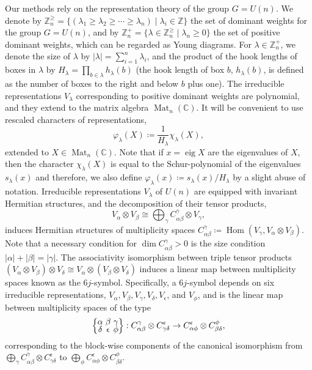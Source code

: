 \documentclass[notitlepage, 11pt, letterpaper]{amsart}
\theoremstyle{plain}
\theoremstyle{definition}
\DeclareMathOperator{\Mat}{Mat}
\DeclareMathOperator{\Hom}{Hom}
\DeclareMathOperator{\eig}{eig}
\newcommand{\undomweights}[1]{\mathbb Z^{\geq}_{#1}}
\newcommand{\undomweightsp}[1]{\mathbb Z^{+}_{#1}}
\newcommand{\ot}{\otimes} %
\newcommand{\vp}{\varphi} %
\newcommand{\ex}{x}
\newcommand{\ya}{\alpha}
\newcommand{\yb}{\beta}
\newcommand{\yc}{\gamma}
\newcommand{\yd}{\delta}
\newcommand{\ye}{\epsilon}
\newcommand{\yf}{\phi}
\newcommand{\yx}{\lambda}
\newcommand{\sya}{|\ya|}
\newcommand{\syb}{|\yb|}
\newcommand{\syc}{|\yc|}
\newcommand{\syx}{|\yx|}
\newcommand{\tightcurlysixj}[1]{
\begingroup
\arraycolsep=1.5pt
\renewcommand{\arraystretch}{0.3}
\left\{\!\begin{array}{ccc}
    #1
\end{array}\!\right\}
\endgroup
}
\newcommand{\abcdefsymbol}{\tightcurlysixj{\alpha & \beta & \gamma \\ \delta & \epsilon & \phi}}
\begin{document}
Our methods rely on the representation theory of the group $G = U(n)$.
We denote by $\undomweights{n} = \{ (\yx_1 \geq \yx_2 \geq \cdots \geq \yx_n) \mid \yx_i \in \mathbb{Z} \}$ the set of dominant weights for the group $G=U(n)$, and
by $\undomweightsp{n} = \{ \yx \in \undomweights{n} \mid \yx_n \geq 0\}$ the set of positive dominant weights, which can be regarded as Young diagrams.
For $\yx \in \undomweightsp{n}$, we denote the size of $\yx$ by $\syx = \sum_{i=1}^n \yx_i$, and the product of the hook lengths of boxes in $\yx$ by $H_{\yx} = \prod_{b\in \yx} h_{\yx}(b)$ (the hook length of box $b$, $h_{\yx}(b)$, is defined as the number of boxes to the right and below $b$ plus one).
The irreducible representations $V_{\yx}$ corresponding to positive dominant weights are polynomial, and they extend to the matrix algebra $\Mat_n(\mathbb{C})$.
It will be convenient to use rescaled characters of representations,
\begin{equation}
    \vp_\yx(X) \coloneq \frac{1}{H_\yx} \chi_\yx(X),
\end{equation}
extended to $X \in \Mat_n(\mathbb{C})$.
Note that if $\ex = \eig X$ are the eigenvalues of $X$, then the character $\chi_\yx(X)$ is equal to the Schur-polynomial of the eigenvalues $s_{\yx}(\ex)$ and therefore, we also define $\vp_{\yx}(\ex) \coloneqq s_{\yx}(\ex)/H_\yx$ by a slight abuse of notation.
Irreducible representations $V_\yx$ of $U(n)$ are equipped with invariant Hermitian structures, and the decomposition of their tensor products,
\begin{equation}
    V_\ya \otimes V_\yb \cong \bigoplus_\yc C_{\ya \yb}^\yc \otimes V_\yc,
\end{equation}
induces Hermitian structures of multiplicity spaces $C_{\ya \yb}^\yc \coloneqq \Hom(V_{\yc}, V_{\ya}\ot V_{\yb})$.
Note that a necessary condition for $\dim C_{\ya \yb}^\yc > 0$ is the size condition $\sya + \syb = \syc$.
The associativity isomorphism between triple tensor products $(V_\ya \ot V_\yb) \ot V_\yd \cong V_\ya \ot (V_\yb \ot V_\yd)$ induces a linear map between multiplicity spaces known as the $6j$-symbol.
Specifically, a $6j$-symbol depends on six irreducible representations, $V_{\ya}, V_{\yb}, V_{\yc}, V_{\yd}, V_{\ye}$, and $V_{\yf}$, and is the linear map between multiplicity spaces of the type
\begin{equation*}
    \abcdefsymbol :
    C^{\yc}_{\ya\yb} \ot C^{\ye}_{\yc\yd} \to C^{\ye}_{\ya\yf} \ot C^{\yf}_{\yb\yd},
\end{equation*}
corresponding to the block-wise components of the canonical isomorphism from $\bigoplus_{\yc} C^{\yc}_{\ya\yb} \ot C^{\ye}_{\yc\yd}$ to $\bigoplus_{\yf} C^{\ye}_{\ya\yf} \ot C^{\yf}_{\yb\yd}$.
\end{document}
